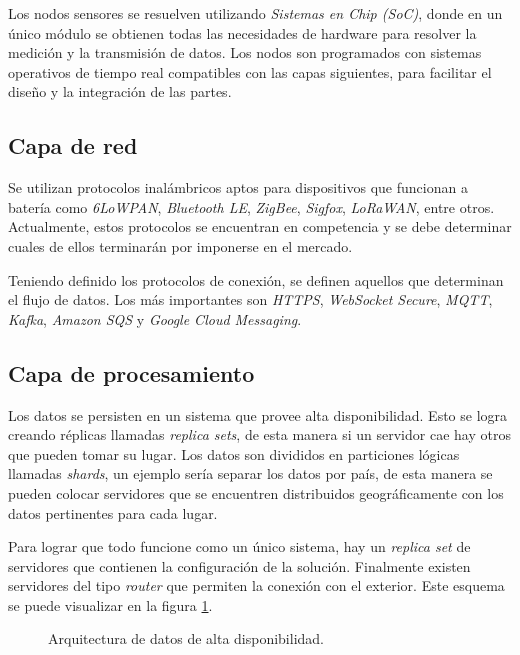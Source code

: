 		Los nodos sensores se resuelven utilizando \emph{Sistemas en Chip (SoC)}, donde en un único módulo se obtienen todas las necesidades de hardware para resolver la medición y la transmisión de datos. Los nodos son programados con sistemas operativos de tiempo real compatibles con las capas siguientes, para facilitar el diseño y la integración de las partes.
	
	\subsection{Capa de red}
	\label{artRed}
	
		Se utilizan protocolos inalámbricos aptos para dispositivos que funcionan a batería como \emph{6LoWPAN}, \emph{Bluetooth LE}, \emph{ZigBee}, \emph{Sigfox}, \emph{LoRaWAN}, entre otros. Actualmente, estos protocolos se encuentran en competencia y se debe determinar cuales de ellos terminarán por imponerse en el mercado.
		
		Teniendo definido los protocolos de conexión, se definen aquellos que determinan el flujo de datos. Los más importantes son \emph{HTTPS}, \emph{WebSocket Secure}, \emph{MQTT}, \emph{Kafka}, \emph{Amazon SQS} y \emph{Google Cloud Messaging}.
	
	\subsection{Capa de procesamiento}
	\label{artProcesamiento}
	
		Los datos se persisten en un sistema que provee alta disponibilidad. Esto se logra creando réplicas llamadas \emph{replica sets}, de esta manera si un servidor cae hay otros que pueden tomar su lugar. Los datos son divididos en particiones lógicas llamadas \emph{shards}, un ejemplo sería separar los datos por país, de esta manera se pueden colocar servidores que se encuentren distribuidos geográficamente con los datos pertinentes para cada lugar.
		
		Para lograr que todo funcione como un único sistema, hay un \emph{replica set} de servidores que contienen la configuración de la solución. Finalmente existen servidores del tipo \emph{router} que permiten la conexión con el exterior. Este esquema se puede visualizar en la figura \ref{fig:mongodb}.
	
		\begin{figure}[h]
			\centering
			\caption{Arquitectura de datos de alta disponibilidad.}
			\label{fig:mongodb}
		\end{figure}
	
